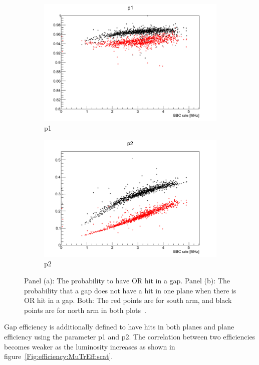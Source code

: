 \begin{figure}
  \centering
	\begin{subfigure}{0.5\textwidth}
		\centering
		\includegraphics[width=0.9\linewidth]{./figures/mutr_hiteff_run13_p1.png}
		\caption{p1}
	\end{subfigure}%
	\begin{subfigure}{0.5\textwidth}
		\centering
		\includegraphics[width=0.9\linewidth]{./figures/mutr_hiteff_run13_p2.png}
    \caption{p2}
	\end{subfigure}
  \caption{
    Panel (a): The probability to have OR hit in a gap. Panel (b): The
    probability that a gap does not have a hit in one plane when there is OR hit
    in a gap. Both: The red points are for south arm, and black points are for
    north arm in both plots~\cite{Seidl2014}.
  }
  \label{Fig:efficiency:MuTrEff:hitprob}
\end{figure}

Gap efficiency is additionally defined to have hits in both planes and plane
efficiency using the parameter p1 and p2. The correlation between two
efficiencies becomes weaker as the luminosity increases as shown in
figure~\ref{Fig:efficiency:MuTrEff:scat}.

